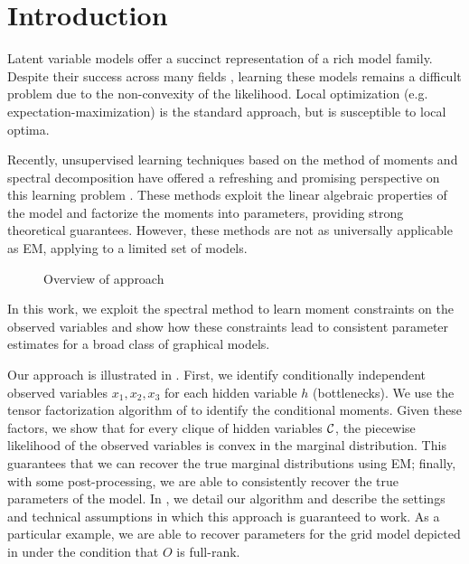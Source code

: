 \section{Introduction}
\label{sec:introduction}

Latent variable models offer a succinct representation of a rich model
family. 
Despite their success across many fields
\cite{quattoni04crf,haghighi06prototype,liang06discrimative,kirkpatrick10painless},
learning these models remains a difficult problem due to the
non-convexity of the likelihood. Local optimization (e.g.
expectation-maximization) is the standard approach, but is susceptible
to local optima.

Recently, unsupervised learning techniques based on the method of moments and
spectral decomposition have offered a refreshing and promising perspective on
this learning problem \citep{hsu09spectral,anandkumar11tree,anandkumar12moments,anandkumar12lda,hsu12identifiability,balle11transducer,balle12automata}.
These methods exploit the linear algebraic properties of the model and
factorize the moments into parameters, providing strong theoretical guarantees.
However, these methods are not as universally applicable as EM, applying to a limited set of models.

\begin{figure}[t]
  \label{fig:approach}
  \centering
  
  \caption{Overview of approach}
\end{figure}

In this work, we exploit the spectral method to learn moment constraints
on the observed variables and show how these constraints lead to consistent parameter estimates for a broad class of graphical models.

Our approach is illustrated in . 
First, we identify conditionally independent observed variables $x_1,
  x_2, x_3$ for each hidden variable $h$ (bottlenecks). 
We use the tensor factorization algorithm of
  \citet{anandkumar12moments,anandkumar13tensor} to identify the
  conditional moments.
Given these factors, we show that for every clique of hidden variables
  $\mathcal{C}$, the piecewise likelihood of the observed variables is convex in
  the marginal distribution. 
This guarantees that we can recover the true marginal distributions
  using EM; finally, with some post-processing, we are able to
  consistently recover the true parameters of the model.
In , we detail our algorithm and describe the
  settings and technical assumptions in which this approach is guaranteed
  to work.
As a particular example, we are able to recover parameters for the
  grid model depicted in  under the condition that
  $O$ is full-rank.

